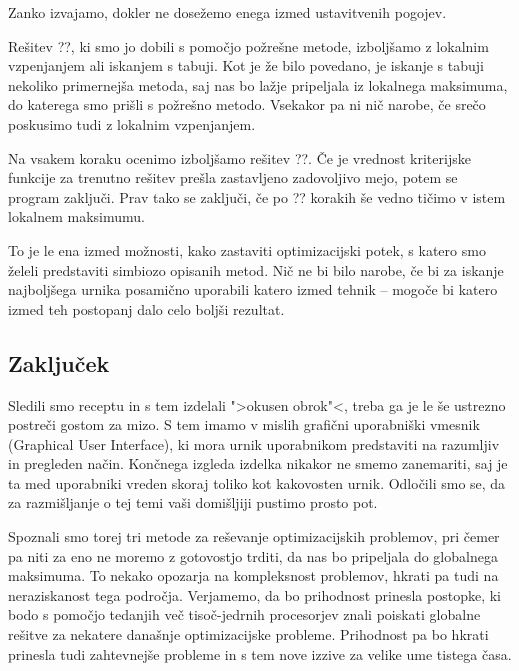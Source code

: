 \documentclass[a4paper,10pt]{article}
\begin{document}
   Zanko izvajamo, dokler ne dosežemo enega izmed ustavitvenih pogojev.

   Rešitev ??, ki smo jo dobili s pomočjo požrešne metode, izboljšamo z lokalnim vzpenjanjem
   ali iskanjem s tabuji. Kot je že bilo povedano, je iskanje s tabuji nekoliko primernejša metoda,
   saj nas bo lažje pripeljala iz lokalnega maksimuma, do katerega smo prišli s požrešno metodo.
   Vsekakor pa ni nič narobe, če srečo poskusimo tudi z lokalnim vzpenjanjem.

   Na vsakem koraku ocenimo izboljšamo rešitev ??. Če je vrednost kriterijske funkcije
   za trenutno rešitev prešla zastavljeno zadovoljivo mejo, potem se program zaključi. Prav tako
   se zaključi, če po ?? korakih še vedno tičimo v istem lokalnem maksimumu.

To je le ena izmed možnosti, kako zastaviti optimizacijski potek, s katero smo želeli predstaviti
simbiozo opisanih metod. Nič ne bi bilo narobe, če bi za iskanje najboljšega urnika posamično
uporabili katero izmed tehnik -- mogoče bi katero izmed teh postopanj dalo celo boljši rezultat.

\subsection{Zaključek}

Sledili smo receptu in s tem izdelali ">okusen obrok"<, treba ga je le še ustrezno postreči
gostom za mizo. S tem imamo v mislih grafični uporabniški vmesnik (Graphical
User Interface), ki mora urnik uporabnikom predstaviti na razumljiv in
pregleden način. Končnega izgleda izdelka nikakor ne smemo zanemariti, saj je ta med uporabniki
vreden skoraj toliko kot kakovosten urnik. Odločili smo se, da za razmišljanje o tej temi vaši
domišljiji pustimo prosto pot.

Spoznali smo torej tri metode za reševanje optimizacijskih problemov, pri čemer pa niti za eno
ne moremo z gotovostjo trditi, da nas bo pripeljala do globalnega maksimuma. To nekako opozarja
na kompleksnost problemov, hkrati pa tudi na neraziskanost tega področja. Verjamemo, da bo
prihodnost prinesla postopke, ki bodo s pomočjo tedanjih več tisoč-jedrnih procesorjev znali
poiskati globalne rešitve za nekatere današnje optimizacijske probleme. Prihodnost pa bo
hkrati prinesla tudi zahtevnejše probleme in s tem nove izzive za velike ume tistega časa.
\end{document}
